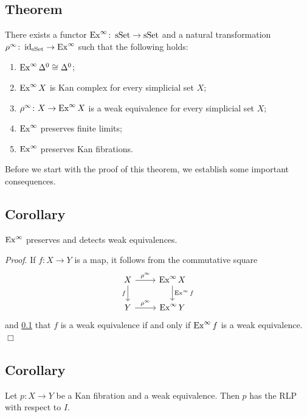     \subsection{Theorem}\label{chV-4-1}
        There exists a functor $\operatorname{Ex}^{\infty} \colon \operatorname{sSet} \to \operatorname{sSet}$ and a natural transformation $\rho^{\infty} \colon \operatorname{id}_{\operatorname{sSet}} \to \operatorname{Ex}^{\infty}$ such that the following holds:
        \begin{enumerate}[label=\roman*)]
            \item 
                $\operatorname{Ex}^{\infty} \Delta^0 \cong \Delta^0$;\label{chV-4-1-1}
            \item 
                $\operatorname{Ex}^{\infty} X$ is  Kan complex for every simplicial set $X$;\label{chV-4-1-2}
            \item 
                $\rho^{\infty} \colon X \to \operatorname{Ex}^{\infty} X$ is a weak equivalence for every simplicial set $X$;\label{chV-4-1-3}
            \item 
                $\operatorname{Ex}^{\infty}$ preserves finite limits;\label{chV-4-1-4}
            \item 
                $\operatorname{Ex}^{\infty}$ preserves Kan fibrations.\label{chV-4-1-5}
        \end{enumerate}
        \medskip

        Before we start with the proof of this theorem, we establish some important consequences.

    \subsection{Corollary}\label{chV-4-2}
        $\operatorname{Ex}^{\infty}$ preserves and detects weak equivalences.
        \smallskip

        \emph{Proof}. If $f \colon X \to Y$ is a map, it follows from the commutative square
        \begin{equation*}
            \begin{tikzcd}
                X \arrow[d, "f"'] \arrow[r, "\rho^{\infty}"] & \Ex^{\infty} X \arrow[d, "\Ex^{\infty} f"] \\
                Y \arrow[r, "\rho^{\infty}"] & \Ex^{\infty} Y
            \end{tikzcd}
        \end{equation*}
        and \ref{chV-4-1} that $f$ is a weak equivalence if and only if $\operatorname{Ex}^{\infty} f$ is a weak equivalence.\hfill$\Box$

    \subsection{Corollary}\label{chV-4-3}
        Let $p \colon X \to Y$ be a Kan fibration and a weak equivalence. Then $p$ has the RLP with respect to $I$.
        \smallskip

